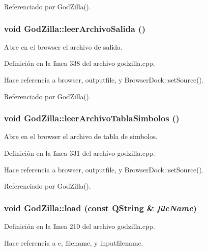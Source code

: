 Referenciado por God\-Zilla().
\subsubsection{\setlength{\rightskip}{0pt plus 5cm}void God\-Zilla::leer\-Archivo\-Salida ()\hspace{0.3cm}{\tt  [private, slot]}}\label{classGodZilla_k2}


Abre en el browser el archivo de salida. 



Definici\'{o}n en la l\'{\i}nea 338 del archivo godzilla.cpp.

Hace referencia a browser, outputfile, y Browser\-Dock::set\-Source().

Referenciado por God\-Zilla().
\subsubsection{\setlength{\rightskip}{0pt plus 5cm}void God\-Zilla::leer\-Archivo\-Tabla\-Simbolos ()\hspace{0.3cm}{\tt  [private, slot]}}\label{classGodZilla_k3}


Abre en el browser el archivo de tabla de simbolos. 



Definici\'{o}n en la l\'{\i}nea 331 del archivo godzilla.cpp.

Hace referencia a browser, outputfile, y Browser\-Dock::set\-Source().

Referenciado por God\-Zilla().
\subsubsection{\setlength{\rightskip}{0pt plus 5cm}void God\-Zilla::load (const QString \& {\em file\-Name})\hspace{0.3cm}{\tt  [private, slot]}}\label{classGodZilla_k6}




Definici\'{o}n en la l\'{\i}nea 210 del archivo godzilla.cpp.

Hace referencia a e, filename, y inputfilename.

